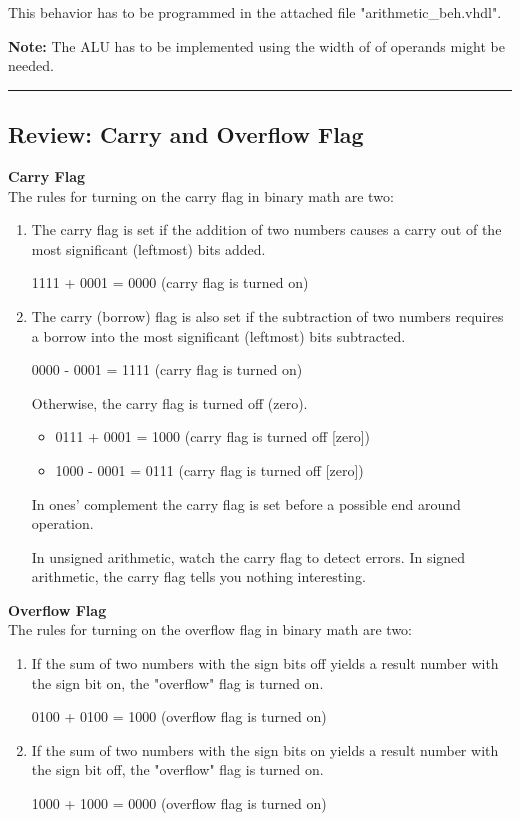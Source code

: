 \documentclass[a4paper,12pt]{article}
\begin{document}
This behavior has to be programmed in the attached file "arithmetic\_beh.vhdl". 


\textbf{Note:} The ALU has to be implemented using the width of %
of operands might be needed.


\rule{16cm}{0.4pt}\par
\subsection*{Review: Carry and Overflow Flag}

\textbf{Carry Flag}\\
The rules for turning on the carry flag in binary math are two:
\begin{enumerate}
\item The carry flag is set if the addition of two numbers causes a carry
   out of the most significant (leftmost) bits added.

   1111 + 0001 = 0000 (carry flag is turned on)

\item The carry (borrow) flag is also set if the subtraction of two numbers
   requires a borrow into the most significant (leftmost) bits subtracted.

   0000 - 0001 = 1111 (carry flag is turned on)

Otherwise, the carry flag is turned off (zero).
\begin{itemize}
\item 0111 + 0001 = 1000 (carry flag is turned off [zero])
\item 1000 - 0001 = 0111 (carry flag is turned off [zero])
\end{itemize} 

In ones' complement the carry flag is set before a possible end around operation.

In unsigned arithmetic, watch the carry flag to detect errors.
In signed arithmetic, the carry flag tells you nothing interesting.

\end{enumerate}

\textbf{Overflow Flag}\\
The rules for turning on the overflow flag in binary math are two:
\begin{enumerate}
\item If the sum of two numbers with the sign bits off yields a result number
   with the sign bit on, the "overflow" flag is turned on.

   0100 + 0100 = 1000 (overflow flag is turned on)

\item If the sum of two numbers with the sign bits on yields a result number
   with the sign bit off, the "overflow" flag is turned on.

   1000 + 1000 = 0000 (overflow flag is turned on)
\end{enumerate}
\end{document}

